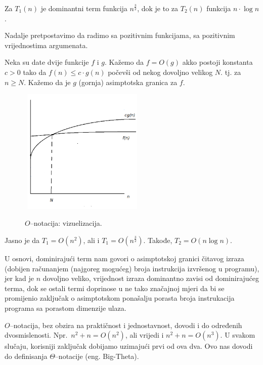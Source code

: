 Za $T_1(n)$  je dominantni term funkcija $n^{\frac{3}{2}}$, dok je to za $T_2(n)$ funkcija $n \cdot \log n$. 
 
 Nadalje pretpostavimo da radimo sa pozitivnim funkcijama, sa pozitivnim vrijednostima argumenata. 


\begin{definition}
Neka su date dvije funkcije $f$ i $g$. Kažemo da $f = O(g)$ akko postoji konstanta $c >0$ tako da $f(n) \leq c \cdot g(n)$ počevši od nekog dovoljno velikog $N$. tj. za $n \geq {N}$. Kažemo da je $g$ (gornja) asimptotska granica za $f$. 
\end{definition}

\begin{figure}[H]
	\centering
	\includegraphics[width=170pt,height=170pt]{slike/O_notation.png}
	\label{fig:O_notation}
	\caption{$O$--notacija: vizuelizacija.}
\end{figure}



\begin{example}
	Jasno je da $T_1 = O(n^2)$, ali i $T_1 = O(n^{\frac{3}{2}})$. Takođe, $T_2 = O(n \log n)$. 
\end{example}

U osnovi, dominirajući term nam govori o asimptotskoj granici čitavog izraza (dobijen računanjem (najgoreg mogućeg) broja instrukcija izvršenog u programu), jer kad je $n$ dovoljno veliko, vrijednost izraza dominantno zavisi od dominirajućeg terma, dok se ostali termi doprinose u ne tako značajnoj mjeri da bi se promijenio zaključak o asimptotskom ponašalju porasta broja instrukacija programa sa porastom dimenzije ulaza. 

$O$--notacija, bez obzira na praktičnost i jednostavnost, dovodi i do određenih  dvosmislenosti. Npr.\  $n^2 + n = O(n^2)$, ali vrijedi i $n^2 + n = O(n^3)$. U svakom slučaju, korisniji zaključak dobijamo uzimajući prvi od ova dva.  Ovo nas dovodi do definisanja $\Theta$--notacije (eng. Big-Theta).

